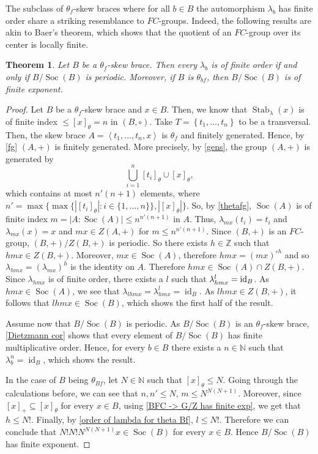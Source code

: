 \documentclass{amsart}
\newcommand{\id}{\operatorname{id}}
\newcommand{\Z}{\mathbb{Z}}
\newcommand{\N}{\mathbb{N}}
\newcommand{\Soc}{\operatorname{Soc}}
\newcommand{\Stab}{\operatorname{Stab}}
\newtheorem{thm}{Theorem}[section]
\begin{document}
The subclass of $\theta_f$-skew braces where for all $b \in B$ the automorphism $\lambda_b$ has finite order share a striking resemblance to $FC$-groups. Indeed, the following results are akin to Baer's theorem, which shows that the quotient of an $FC$-group over its center is locally finite.

\begin{thm}\label{unsatisfacttheorem}
    Let $B$ be a $\theta_f$-skew brace.
    Then every $\lambda_b$ is of finite order if and only if $B/\Soc(B)$ is periodic. 
    Moreover, if $B$ is $\theta_{bf}$, then $B/\Soc(B)$ is of finite exponent.
\end{thm}
\begin{proof}
Let $B$ be a $\theta_f$-skew brace and  $x \in B$.
Then, we know that $\Stab_{\lambda}(x) $ is 
of finite index $\leq [x]_\theta=n$
in $(B,\circ)$.
Take $T=\left\lbrace t_1,..., t_n \right\rbrace$ to be a transversal. 
Then, the skew brace $A=\left<t_1,...,t_n,x\right>$ is $\theta_f$ and finitely generated. 
Hence, by \cref{fg} $(A,+)$ is finitely generated. 
More precisely, by \cref{gens}, 
the group $(A,+)$ is generated by 
\[
\bigcup_{i=1}^n\left\lbrack t_i\right\rbrack_{\theta} \cup [x]_{\theta},
\]
which contains at most $n'(n+1)$ elements, 
where $n'=\max\{\max\{|[t_i]_\theta|:i\in \{1,...,n\}\},|[x]_\theta|\}$.
So, by \cref{thetafg},
$\Soc(A)$ is of finite index $m=|A:\Soc(A)|\leq n^{n'(n+1)}$ in $A$.
Thus, $\lambda_{mx}(t_i) = t_i$ and $\lambda_{mx}(x) =x$ and $mx \in Z(A,+)$ for $m\leq n^{n'(n+1)}$.
Since $(B,+)$ is an $FC$-group,
$(B,+)/Z(B,+)$ is periodic.
So  there exists $h\in \Z$ such that $hmx\in Z(B,+)$.
Moreover, $mx\in\Soc(A)$, therefore 
$hmx=(mx)^{\circ h}$ and so 
$\lambda_{hmx}=(\lambda_{mx})^h$
is the identity on $A$.
Therefore $hmx\in \Soc(A)\cap Z(B,+)$.
Since $\lambda_{hmx}$ is of finite order,
there exists a $l$ such that $\lambda_{hmx}^l=\textup{id}_B$.
As $hmx\in \Soc(A)$, we see that $\lambda_{lhmx}=\lambda_{hmx}^l=\id_B$.
As $lhmx \in Z(B,+)$, it follows that $lhmx \in \Soc(B)$, which shows the first half of the result. 

Assume now that $B/\Soc(B)$ is periodic. As $B/\Soc(B)$ is an $\theta_f$-skew brace, \cref{Dietzmann cor} shows that every element of $B/\Soc(B)$ has finite multiplicative order. 
Hence, for every $b \in B$ there exists a $n\in \N$ such that $\lambda_b^n=\id_B$, which shows the result.

In the case of $B$ being $\theta_{Bf}$,
let $N\in \N$ such that $[x]_\theta\leq N$.
Going through the calculations before,
we can see that $n,n'\leq N$, $m\leq N^{N(N+1)}$.
Moreover, since $[x]_+\subseteq [x]_\theta$ for every $x\in B$,
using \cref{BFC -> G/Z has finite exp}, we get that $h\leq N!$.
Finally, by \cref{order of lambda for theta Bf}, $ l\leq N!$.
Therefore we can conclude that $N! N!  N^{N(N+1)} x\in\Soc(B)$
for every $x\in B$.
Hence $B/\Soc(B)$ has finite exponent.
\end{proof}
\end{document}
